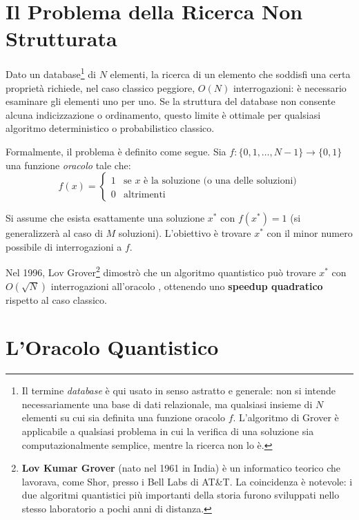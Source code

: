 \begin{onehalfspace}

\section{Il Problema della Ricerca Non Strutturata}

Dato un database\footnote{Il termine \textit{database} è qui usato in senso astratto e generale: non si intende necessariamente una base di dati relazionale, ma qualsiasi insieme di $N$ elementi su cui sia definita una funzione oracolo $f$. L'algoritmo di Grover è applicabile a qualsiasi problema in cui la verifica di una soluzione sia computazionalmente semplice, mentre la ricerca non lo è.} di $N$ elementi, la ricerca di un elemento che soddisfi una certa proprietà richiede, nel caso classico peggiore, $O(N)$ interrogazioni: è necessario esaminare gli elementi uno per uno. Se la struttura del database non consente alcuna indicizzazione o ordinamento, questo limite è ottimale per qualsiasi algoritmo deterministico o probabilistico classico.

Formalmente, il problema è definito come segue. Sia $f:\{0,1,\ldots,N-1\} \to \{0,1\}$ una funzione \textit{oracolo} tale che:
\begin{equation}
    f(x) = \begin{cases} 1 & \text{se } x \text{ è la soluzione (o una delle soluzioni)} \\ 0 & \text{altrimenti} \end{cases}
\end{equation}

Si assume che esista esattamente una soluzione $x^*$ con $f(x^*) = 1$ (si generalizzerà al caso di $M$ soluzioni). L'obiettivo è trovare $x^*$ con il minor numero possibile di interrogazioni a $f$.

Nel 1996, Lov Grover\footnote{\textbf{Lov Kumar Grover} (nato nel 1961 in India) è un informatico teorico che lavorava, come Shor, presso i Bell Labs di AT\&T. La coincidenza è notevole: i due algoritmi quantistici più importanti della storia furono sviluppati nello stesso laboratorio a pochi anni di distanza.} dimostrò che un algoritmo quantistico può trovare $x^*$ con $O(\sqrt{N})$ interrogazioni all'oracolo \cite{grover1996}, ottenendo uno \textbf{speedup quadratico} rispetto al caso classico.

\section{L'Oracolo Quantistico}


\end{onehalfspace}
